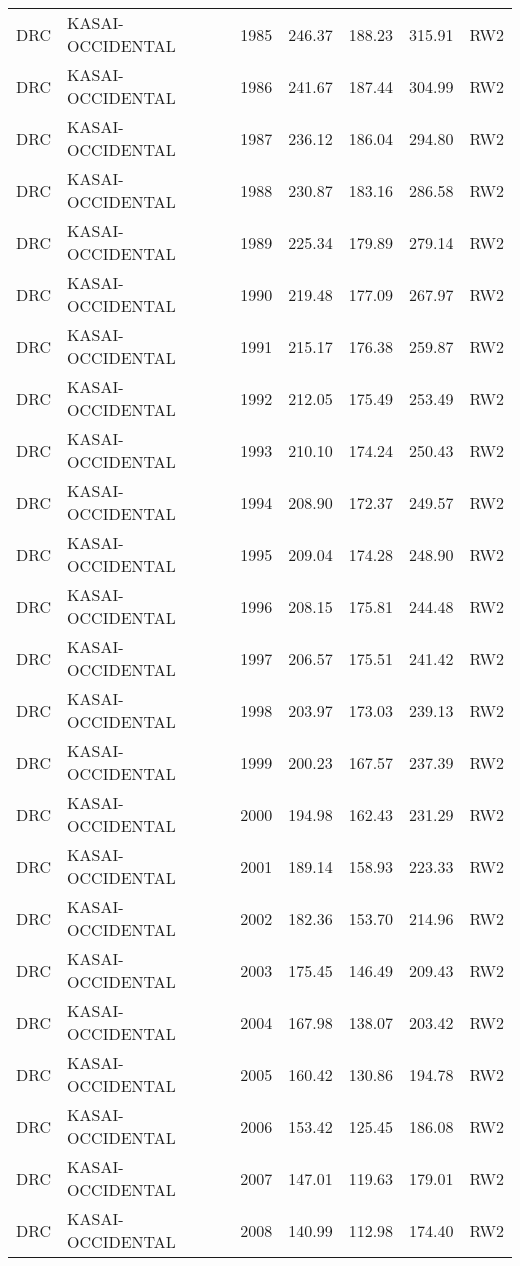 \begin{longtable}{lllrrrl}
  DRC & KASAI-OCCIDENTAL & 1985 & 246.37 & 188.23 & 315.91 & RW2 \\ 
  DRC & KASAI-OCCIDENTAL & 1986 & 241.67 & 187.44 & 304.99 & RW2 \\ 
  DRC & KASAI-OCCIDENTAL & 1987 & 236.12 & 186.04 & 294.80 & RW2 \\ 
  DRC & KASAI-OCCIDENTAL & 1988 & 230.87 & 183.16 & 286.58 & RW2 \\ 
  DRC & KASAI-OCCIDENTAL & 1989 & 225.34 & 179.89 & 279.14 & RW2 \\ 
  DRC & KASAI-OCCIDENTAL & 1990 & 219.48 & 177.09 & 267.97 & RW2 \\ 
  DRC & KASAI-OCCIDENTAL & 1991 & 215.17 & 176.38 & 259.87 & RW2 \\ 
  DRC & KASAI-OCCIDENTAL & 1992 & 212.05 & 175.49 & 253.49 & RW2 \\ 
  DRC & KASAI-OCCIDENTAL & 1993 & 210.10 & 174.24 & 250.43 & RW2 \\ 
  DRC & KASAI-OCCIDENTAL & 1994 & 208.90 & 172.37 & 249.57 & RW2 \\ 
  DRC & KASAI-OCCIDENTAL & 1995 & 209.04 & 174.28 & 248.90 & RW2 \\ 
  DRC & KASAI-OCCIDENTAL & 1996 & 208.15 & 175.81 & 244.48 & RW2 \\ 
  DRC & KASAI-OCCIDENTAL & 1997 & 206.57 & 175.51 & 241.42 & RW2 \\ 
  DRC & KASAI-OCCIDENTAL & 1998 & 203.97 & 173.03 & 239.13 & RW2 \\ 
  DRC & KASAI-OCCIDENTAL & 1999 & 200.23 & 167.57 & 237.39 & RW2 \\ 
  DRC & KASAI-OCCIDENTAL & 2000 & 194.98 & 162.43 & 231.29 & RW2 \\ 
  DRC & KASAI-OCCIDENTAL & 2001 & 189.14 & 158.93 & 223.33 & RW2 \\ 
  DRC & KASAI-OCCIDENTAL & 2002 & 182.36 & 153.70 & 214.96 & RW2 \\ 
  DRC & KASAI-OCCIDENTAL & 2003 & 175.45 & 146.49 & 209.43 & RW2 \\ 
  DRC & KASAI-OCCIDENTAL & 2004 & 167.98 & 138.07 & 203.42 & RW2 \\ 
  DRC & KASAI-OCCIDENTAL & 2005 & 160.42 & 130.86 & 194.78 & RW2 \\ 
  DRC & KASAI-OCCIDENTAL & 2006 & 153.42 & 125.45 & 186.08 & RW2 \\ 
  DRC & KASAI-OCCIDENTAL & 2007 & 147.01 & 119.63 & 179.01 & RW2 \\ 
  DRC & KASAI-OCCIDENTAL & 2008 & 140.99 & 112.98 & 174.40 & RW2 \\ 

\end{longtable}
